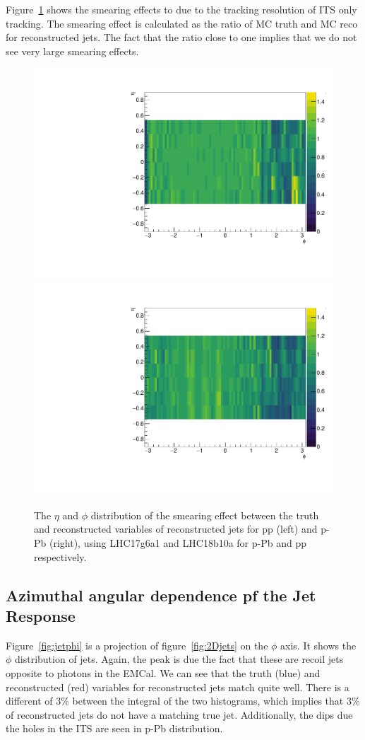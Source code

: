 Figure~\ref{fig:2DSmearjets} shows the smearing effects to due to the tracking resolution of ITS only tracking. The smearing effect is calculated as the ratio of MC truth and MC reco for reconstructed jets. The fact that the ratio close to one implies that we do not see very large smearing effects.  
\begin{figure}[h]
\center
\includegraphics[width=.495\textwidth]{JetResponse/jet_etaPhi_BinbyBin_its_pp.pdf}
\includegraphics[width=.495\textwidth]{JetResponse/jet_etaPhi_BinbyBin_its_pPb.pdf}
\caption{The $\eta$ and $\phi$ distribution of the smearing effect between the truth and reconstructed variables of reconstructed jets for pp (left) and p-Pb (right), using LHC17g6a1 and LHC18b10a for p-Pb and pp respectively.}
\label{fig:2DSmearjets}
\end{figure}

\subsection{Azimuthal angular dependence pf the Jet Response}
Figure~\ref{fig:jetphi} is a projection of figure~\ref{fig:2Djets} on the $\phi$ axis. It shows the $\phi$ distribution of jets. Again, the peak is due the fact that these are recoil jets opposite to photons in the EMCal. We can see that the truth (blue) and reconstructed (red) variables for reconstructed jets match quite well. There is a different of 3\% between the integral of the two histograms, which implies that 3\% of reconstructed jets do not have a matching true jet. Additionally, the dips due the holes in the ITS are seen in p-Pb distribution. 

